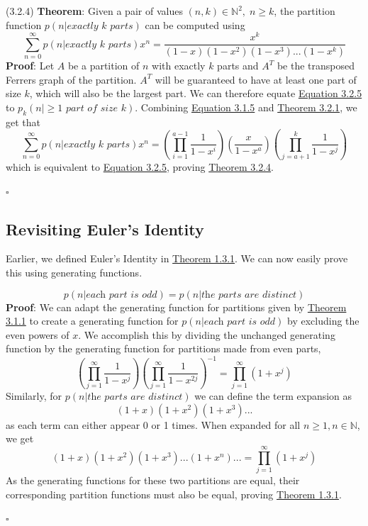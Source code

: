 \documentclass{article}
\newcommand{\separate}[1] {\vspace{#1 pt}\noindent}
\newcommand{\N}{\mathbb{N}}
\newcommand{\theorem}[2]{(#1) \textbf{Theorem}: #2}
\newcommand{\proof}[1]{\textbf{Proof}: #1 \begin{flushright}\(\square\)\end{flushright}}
\begin{document}
\separate{5}\theorem{3.2.4}\label{thm:3.2.4}{Given a pair of values \((n, k) \in \N^2, \;n \geq k\), the partition function \(p(n |\textit{exactly k parts})\) can be computed using}
\begin{equation}\tag{3.2.5}\label{eq:3.2.5}
    \sum^\infty_{n=0}p(n |\textit{exactly k parts})x^n = \frac{x^k}{(1-x)(1-x^2)(1-x^3)...(1-x^k)}
\end{equation}
\proof{Let \(A\) be a partition of \(n\) with exactly \(k\) parts and \(A^T\) be the transposed Ferrers graph of the partition. \(A^T\) will be guaranteed to have at least one part of size \(k\), which will also be the largest part. We can therefore equate \hyperref[eq:3.2.5]{Equation 3.2.5} to \(p_k(n | \geq 1 \textit{ part of size k})\). Combining \hyperref[eq:3.1.5]{Equation 3.1.5} and \hyperref[thm:3.2.1]{Theorem 3.2.1}, we get that
\begin{equation}\tag{3.2.6}\label{eq:3.2.6}
    \sum^\infty_{n=0}p(n |\textit{exactly k parts})x^n = \left(\prod^{a-1}_{i=1}\frac{1}{1-x^i}\right)\left(\frac{x}{1-x^a}\right)\left(\prod^k_{j=a+1}\frac{1}{1-x^j}\right)
\end{equation}
which is equivalent to \hyperref[eq:3.2.5]{Equation 3.2.5}, proving \hyperref[thm:3.2.4]{Theorem 3.2.4}.}

\subsection{Revisiting Euler's Identity}

Earlier, we defined Euler's Identity in \hyperref[thm:1.3.1]{Theorem 1.3.1}. We can now easily prove this using generating functions.

\begin{equation}\tag{3.3.2}\label{eq:3.3.2}
    p(n | \textit{each part is odd}) = p(n | \textit{the parts are distinct})
\end{equation}
\proof{We can adapt the generating function for partitions given by \hyperref[thm:3.1.1]{Theorem 3.1.1} to create a generating function for \(p(n|\textit{each part is odd})\) by excluding the even powers of \(x\). We accomplish this by dividing the unchanged generating function by the generating function for partitions made from even parts,
\begin{equation}\tag{3.3.3}\label{eq:3.3.3}
    \left(\prod^\infty_{j=1} \frac{1}{1-x^{j}}\right)\left(\prod^\infty_{j=1} \frac{1}{1-x^{2j}}\right)^{-1} = \prod^\infty_{j=1}(1+x^j)
\end{equation}
Similarly, for \(p(n|\textit{the parts are distinct})\) we can define the term expansion as 
\[(1+x)\left(1+x^2\right)\left(1+x^3\right)...\]
as each term can either appear 0 or 1 times. When expanded for all \(n\geq1, n \in \N\), we get 
\begin{equation}\tag{3.3.4}\label{eq:3.3.4}
    (1+x)\left(1+x^2\right)\left(1+x^3\right)...\left(1+x^n\right)... = \prod^\infty_{j=1}\left(1+x^j\right)
\end{equation}
As the generating functions for these two partitions are equal, their corresponding partition functions must also be equal, proving \hyperref[thm:1.3.1]{Theorem 1.3.1}.}
\end{document}
